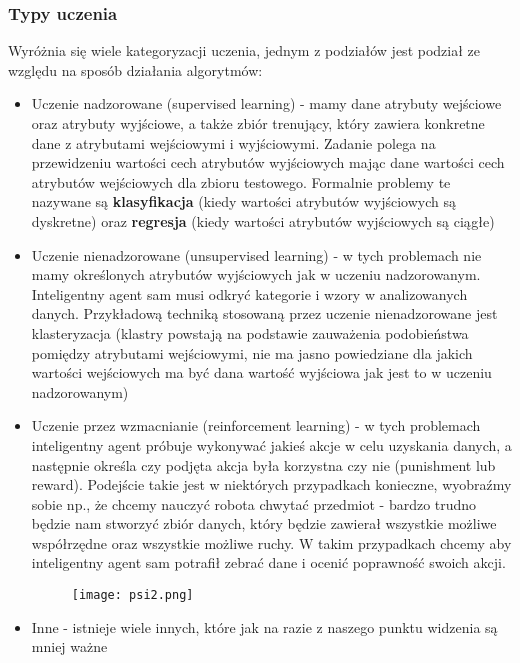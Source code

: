 \documentclass[a4paper,15pt]{article}
\begin{document}
\subsubsection{Typy uczenia}
Wyróżnia się wiele kategoryzacji uczenia, jednym z podziałów jest podział ze względu na sposób działania algorytmów:
\begin{itemize}
\item Uczenie nadzorowane (supervised learning) - mamy dane atrybuty wejściowe oraz atrybuty wyjściowe, a także zbiór trenujący, który zawiera konkretne dane z atrybutami wejściowymi i wyjściowymi. Zadanie polega na przewidzeniu wartości cech atrybutów wyjściowych mając dane wartości cech atrybutów wejściowych dla zbioru testowego. Formalnie problemy te nazywane są \textbf{klasyfikacja} (kiedy wartości atrybutów wyjściowych są dyskretne) oraz \textbf{regresja} (kiedy wartości atrybutów wyjściowych są ciągłe) 

\item Uczenie nienadzorowane (unsupervised learning) - w tych problemach nie mamy określonych atrybutów wyjściowych jak w uczeniu nadzorowanym. Inteligentny agent sam musi odkryć kategorie i wzory w analizowanych danych. Przykładową techniką stosowaną przez uczenie nienadzorowane jest klasteryzacja (klastry powstają na podstawie zauważenia podobieństwa pomiędzy atrybutami wejściowymi, nie ma jasno powiedziane dla jakich wartości wejściowych ma być dana wartość wyjściowa jak jest to w uczeniu nadzorowanym) 


\item Uczenie przez wzmacnianie (reinforcement learning) - w tych problemach inteligentny agent próbuje wykonywać jakieś akcje w celu uzyskania danych, a następnie określa czy podjęta akcja była korzystna czy nie (punishment lub reward). Podejście takie jest w niektórych przypadkach konieczne, wyobraźmy sobie np., że chcemy nauczyć robota chwytać przedmiot - bardzo trudno będzie nam stworzyć zbiór danych, który będzie zawierał wszystkie możliwe współrzędne oraz wszystkie możliwe ruchy. W takim przypadkach chcemy aby inteligentny agent sam potrafił zebrać dane i ocenić poprawność swoich akcji. 
\begin{figure}[H]
\centerline{\texttt{[image: psi2.png]}}
\end{figure}

\item Inne - istnieje wiele innych, które jak na razie z naszego punktu widzenia są mniej ważne
\end{itemize}
\end{document}
